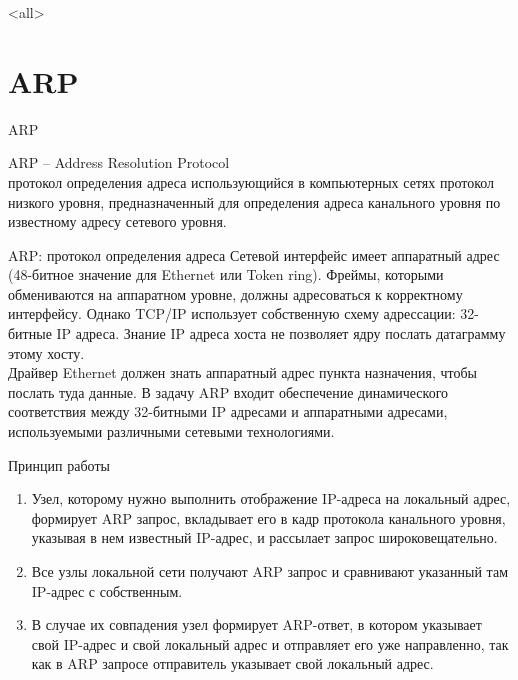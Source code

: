 

\subtitle[TCP/IP]{Стек протоколов TCP/IP\\(Продолжение)}



\mode<all>{}

%
%

\section{ARP}

\begin{frame}{ARP}
	\begin{block}{ARP -- Address Resolution Protocol\\протокол определения адреса}
		использующийся в компьютерных сетях протокол низкого уровня,  предназначенный для определения адреса канального уровня по известному адресу сетевого уровня.
	\end{block}
\end{frame}


\begin{frame}{ARP: протокол определения адреса}
	Сетевой интерфейс имеет аппаратный адрес (48-битное значение для Ethernet или Token ring). 
Фреймы,  которыми обмениваются на аппаратном уровне,  должны адресоваться к корректному интерфейсу. 
Однако TCP/IP использует собственную схему адрессации: 32-битные IP адреса. 
Знание IP адреса хоста не позволяет ядру послать датаграмму этому хосту.\\
Драйвер Ethernet должен знать аппаратный адрес пункта назначения,  чтобы послать туда данные. В задачу ARP входит обеспечение динамического соответствия между 32-битными IP адресами и аппаратными адресами,  используемыми различными сетевыми технологиями.
\end{frame}

\begin{frame}{Принцип работы}
	\begin{enumerate}
		\item Узел,  которому нужно выполнить отображение IP-адреса на локальный адрес,  формирует ARP запрос,  вкладывает его в кадр протокола канального уровня,  указывая в нем известный IP-адрес,  и рассылает запрос широковещательно.
		\item Все узлы локальной сети получают ARP запрос и сравнивают указанный там IP-адрес с собственным.
		\item В случае их совпадения узел формирует ARP-ответ,  в котором указывает свой IP-адрес и свой локальный адрес и отправляет его уже направленно,  так как в ARP запросе отправитель указывает свой локальный адрес.
	\end{enumerate}
\end{frame}

